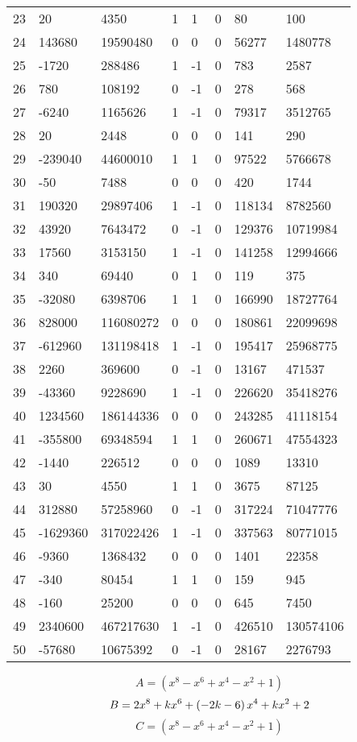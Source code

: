 \documentclass{amsart}
\begin{document}
\begin{longtable}{|l|l|l|lllll|}
23&20&4350&1&1&0&80&100\\
24&143680&19590480&0&0&0&56277&1480778\\
25&-1720&288486&1&-1&0&783&2587\\
26&780&108192&0&-1&0&278&568\\
27&-6240&1165626&1&-1&0&79317&3512765\\
28&20&2448&0&0&0&141&290\\
29&-239040&44600010&1&1&0&97522&5766678\\
30&-50&7488&0&0&0&420&1744\\
31&190320&29897406&1&-1&0&118134&8782560\\
32&43920&7643472&0&-1&0&129376&10719984\\
33&17560&3153150&1&-1&0&141258&12994666\\
34&340&69440&0&1&0&119&375\\
35&-32080&6398706&1&1&0&166990&18727764\\
36&828000&116080272&0&0&0&180861&22099698\\
37&-612960&131198418&1&-1&0&195417&25968775\\
38&2260&369600&0&-1&0&13167&471537\\
39&-43360&9228690&1&-1&0&226620&35418276\\
40&1234560&186144336&0&0&0&243285&41118154\\
41&-355800&69348594&1&1&0&260671&47554323\\
42&-1440&226512&0&0&0&1089&13310\\
43&30&4550&1&1&0&3675&87125\\
44&312880&57258960&0&-1&0&317224&71047776\\
45&-1629360&317022426&1&-1&0&337563&80771015\\
46&-9360&1368432&0&0&0&1401&22358\\
47&-340&80454&1&1&0&159&945\\
48&-160&25200&0&0&0&645&7450\\
49&2340600&467217630&1&-1&0&426510&130574106\\
50&-57680&10675392&0&-1&0&28167&2276793\\
\hline
\end{longtable}
$$A=(x^8
 - x^6
 + x^4
 - x^2
 + 1)$$
$$B=2\*x^8
 + k\*x^6
 + \left(-2\*k
 - 6\right) \*x^4
 + k\*x^2
 + 2$$
$$C=(x^8
 - x^6
 + x^4
 - x^2
 + 1)$$
\end{document}
